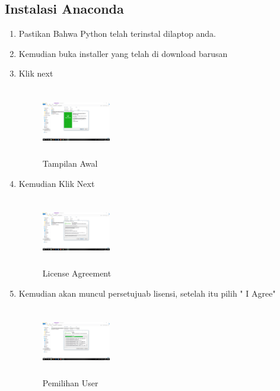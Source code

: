 \subsection{Instalasi Anaconda}
\begin{enumerate}
    \item Pastikan Bahwa Python telah terinstal dilaptop anda.
    \item Kemudian buka installer yang telah di download barusan
    \item Klik next
    \begin{figure}[!htbp]
        \centering
        \includegraphics[width=3cm,height=3cm]{figures/1.png}
        \caption{Tampilan Awal}
        \label{awal}
        \end{figure}

    \item Kemudian Klik Next
    \begin{figure}[!htbp]
        \centering
        \includegraphics[width=3cm,height=3cm]{figures/2.png}
        \caption{License Agreement}
        \label{License}
        \end{figure}

    \item Kemudian akan muncul persetujuab lisensi, setelah itu pilih " I Agree"
    \begin{figure}[!htbp]
        \centering
        \includegraphics[width=3cm,height=3cm]{figures/3.png}
        \caption{Pemilihan User}
        \label{User}
        \end{figure}


\end{enumerate}

